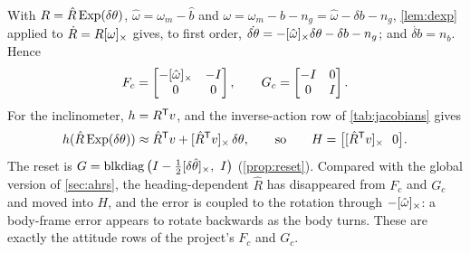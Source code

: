 \begin{solutions}
  \item \ifsolutions
        With $R = \hat R\operatorname{Exp}(\delta\theta)$, $\hat\omega = \omega_m - \hat b$ and $\omega = \omega_m - b - n_g = \hat\omega - \delta b - n_g$, \cref{lem:dexp} applied to
        $\dot R = R[\omega]_{\times}$ gives, to first order, $\dot{\delta\theta} = -[\hat\omega]_{\times}\delta\theta - \delta b - n_g$; and $\dot{\delta b} = n_b$. Hence
        \[
          F_c = \begin{bmatrix}-[\hat\omega]_{\times} & -I\\ 0 & 0\end{bmatrix}, \qquad G_c = \begin{bmatrix}-I & 0\\ 0 & I\end{bmatrix}.
        \]
        For the inclinometer, $h = R^{\mathsf{T}} v$, and the inverse-action row of \cref{tab:jacobians} gives
        \[
          h(\hat R\operatorname{Exp}(\delta\theta)) \approx \hat R^{\mathsf{T}} v + [\hat R^{\mathsf{T}} v]_{\times}\,\delta\theta, \qquad\text{so}\qquad H = \big[[\hat R^{\mathsf{T}} v]_{\times}\ \ 0\big].
        \] The reset is $G = \operatorname{blkdiag}\big(I - \tfrac12[\delta\hat\theta]_{\times},\ I\big)$ (\cref{prop:reset}). Compared with the global version of
        \cref{sec:ahrs}, the heading-dependent $\hat R$ has disappeared from $F_c$ and $G_c$ and moved into $H$, and the error is coupled to the rotation through
        $-[\hat\omega]_{\times}$: a body-frame error appears to rotate backwards as the body turns. These are exactly the attitude rows of the project's $F_c$ and $G_c$.
        \else\withheldsolution\fi
\end{solutions}
